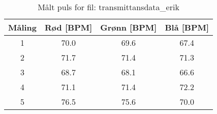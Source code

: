 
\begin{table}[H]
\centering
\caption{Målt puls for fil: transmittansdata\_erik}
\label{tab:transmittansdata\_erik}
\begin{tabular}{|c|c|c|c|}
\hline
\textbf{Måling} & \textbf{Rød [BPM]} & \textbf{Grønn [BPM]} & \textbf{Blå [BPM]} \\ \hline
1 & 70.0 & 69.6 & 67.4 \\ \hline
2 & 71.7 & 71.4 & 71.3 \\ \hline
3 & 68.7 & 68.1 & 66.6 \\ \hline
4 & 71.1 & 71.4 & 72.2 \\ \hline
5 & 76.5 & 75.6 & 70.0 \\ \hline
\end{tabular}
\end{table}
